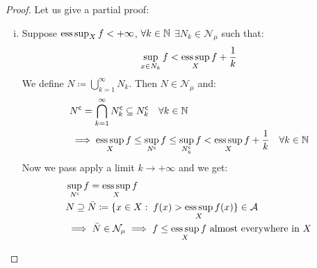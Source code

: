 \begin{proof}
    Let us give a partial proof:
    \begin{enumerate}[i)]
        \item Suppose $\operatorname*{ess\,sup}_X f < +\infty$, $\forall k\in\mathbb{N}$ $\exists N_k \in \mathcal{N}_\mu$ such that:
              \[
                  \sup_{x\in N_k} f < \operatorname*{ess\,sup}_X f + \frac{1}{k}
              \]
              We define $N \coloneqq \bigcup_{k=1}^\infty N_k$. Then $N \in \mathcal{N}_\mu$ and:
              \begin{align*}
                   & N^{\mathsf{c}} = \bigcap_{k=1}^\infty N^{\mathsf{c}}_k \subseteq N^{\mathsf{c}}_k \quad \forall k \in \mathbb{N}                              \\
                   & \implies  \operatorname*{ess\,sup}_X f \leq \sup_{N^{\mathsf{c}}} f \leq \sup_{N^{\mathsf{c}}_k} f < \operatorname*{ess\,sup}_X f + \frac{1}{k} \quad \forall k \in \mathbb{N}
              \end{align*}
              Now we pass apply a limit $k\to+\infty$ and we get:
              \begin{align*}
                   & \sup_{N^{\mathsf{c}}} f = \operatorname*{ess\,sup}_X f                                                             \\
                   & N \supseteq \bar{N} \coloneqq \{ x\in X: \; f(x) > \operatorname*{ess\,sup}_X f(x) \} \in\mathcal{A}                       \\
                   & \implies \bar{N} \in \mathcal{N}_\mu \implies f \leq \operatorname*{ess\,sup}_X f \text{ almost everywhere in } X
              \end{align*}
    \end{enumerate}
\end{proof}